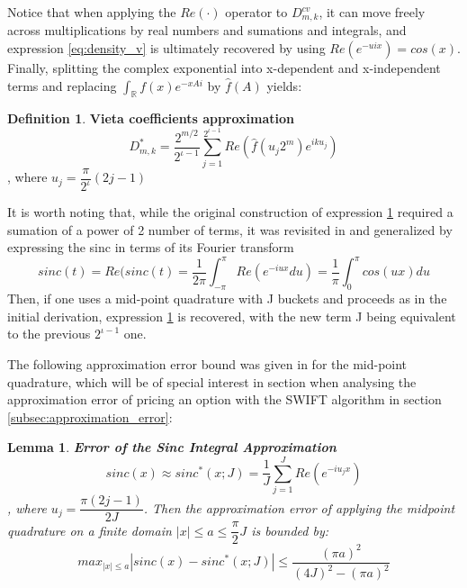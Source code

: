 \documentclass[12,twoside]{mammeTFM}
\newtheorem{lem}[thm]{Lemma}
\theoremstyle{definition}
\newtheorem{definition}[thm]{Definition}
\theoremstyle{remark}
\newcommand{\R}{\ensuremath{\mathbb{R}}}
\begin{document}
\begin{itemize}
{\begin{equation}
\end{equation}
Notice that when applying the $Re(\cdot)$ operator to $D_{m,k}^{cv}$, it can move freely across multiplications by real numbers and sumations and integrals, and expression \ref{eq:density_v} is ultimately recovered by using $Re \left(e^{-uix}\right) = cos(x)$. Finally, splitting the complex exponential into x-dependent and x-independent terms and replacing $\int_{\R} f(x) e^{-xAi}$ by $\hat{f}(A)$ yields:
\begin{definition} \textbf{Vieta coefficients approximation}\label{def:vieta}
\begin{equation}
D_{m,k}^{*} =  \dfrac{2^{m / 2}}{2^{\iota-1}} \sum_{j=1}^{2^{\iota-1}} Re \left( \hat{f} \left(u_j 2^{m} \right) e^{ik u_j} \right)
\end{equation}
, where $u_j = \dfrac{\pi}{2^{\iota}}(2j - 1)$
\end{definition}
}
\end{itemize} 

It is worth noting that, while the original construction of expression \ref{def:vieta} required a sumation of a power of 2 number of terms, it was revisited in \cite{mar17} and generalized by expressing the sinc in terms of its Fourier transform 
\begin{equation}
sinc(t) = Re(sinc(t) = \dfrac{1}{2\pi} \int_{-\pi}^{\pi} Re \left( e^{-iux} du \right) = \dfrac{1}{\pi} \int_{0}^{\pi} cos(ux) du
\end{equation}
Then, if one uses a mid-point quadrature with J buckets and proceeds as in the initial derivation, expression \ref{def:vieta} is recovered, with the new term J being equivalent to the previous $2^{\iota -1}$ one.

The following approximation error bound was given in \cite{mar17} for the mid-point quadrature, which will be of special interest in section when analysing the approximation error of pricing an option with the SWIFT algorithm in section \ref{subsec:approximation_error}:

\begin{lem} \textbf{Error of the Sinc Integral Approximation}
\begin{equation} \label{lem:error_sinc}
sinc(x) \approx sinc^{*}(x; J) = \dfrac{1}{J}\sum_{j = 1}^J Re\left( e^{-iu_jx} \right)
\end{equation}
, where $u_j = \dfrac{\pi (2j - 1)}{2J}$. Then the approximation error of applying the midpoint quadrature on a finite domain $|x| \leq a \leq \dfrac{\pi}{2}J$ is bounded by:
\begin{equation}
max_{|x| \leq a} \left|sinc(x) - sinc^{*}(x; J) \right| \leq \dfrac{(\pi a)^2}{(4J)^2 - (\pi a)^2}
\end{equation}
\end{lem}
\end{document}
